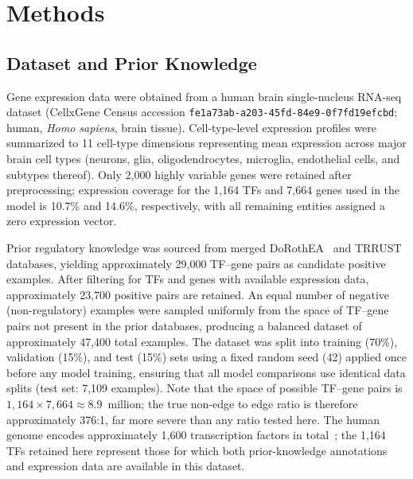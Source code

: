 \documentclass[journal]{IEEEtran}
\begin{document}
\section{Methods}
\label{sec:methods}

\subsection{Dataset and Prior Knowledge}
\label{ssec:data}

Gene expression data were obtained from a human brain single-nucleus RNA-seq
dataset (CellxGene Census accession \texttt{fe1a73ab-a203-45fd-84e9-0f7fd19efcbd};
human, \textit{Homo sapiens}, brain tissue).
Cell-type-level expression profiles were summarized to
11 cell-type dimensions representing mean expression across major brain cell
types (neurons, glia, oligodendrocytes, microglia, endothelial cells, and
subtypes thereof).  Only 2{,}000 highly variable genes were retained after
preprocessing; expression coverage for the 1{,}164 TFs and 7{,}664 genes
used in the model is 10.7\% and 14.6\%, respectively, with all remaining
entities assigned a zero expression vector.

Prior regulatory knowledge was sourced from merged DoRothEA~\cite{garcia2019}
and TRRUST~\cite{han2018} databases, yielding approximately 29,000 TF--gene
pairs as candidate positive examples. After filtering for TFs and genes with
available expression data, approximately 23,700 positive pairs are retained.
An equal number of negative (non-regulatory) examples were sampled uniformly
from the space of TF--gene pairs not present in the prior databases, producing
a balanced dataset of approximately 47,400 total examples. The dataset was
split into training (70\%), validation (15\%), and test (15\%) sets using a
fixed random seed (42) applied once before any model training, ensuring that
all model comparisons use identical data splits (test set: 7,109 examples).
Note that the space of possible TF--gene pairs is $1{,}164 \times 7{,}664
\approx 8.9$~million; the true non-edge to edge ratio is therefore
approximately 376:1, far more severe than any ratio tested here. The human
genome encodes approximately 1,600 transcription factors in total~\cite{lambert2018};
the 1,164 TFs retained here represent those for which both prior-knowledge
annotations and expression data are available in this dataset.
\end{document}
